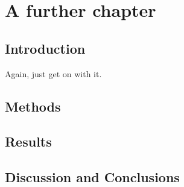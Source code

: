 \chapter[A further chapter]{A further chapter}
\label{ch:chapter4}

\section{Introduction}

Again, just get on with it.

\section{Methods}

\section{Results}

\section{Discussion and Conclusions}